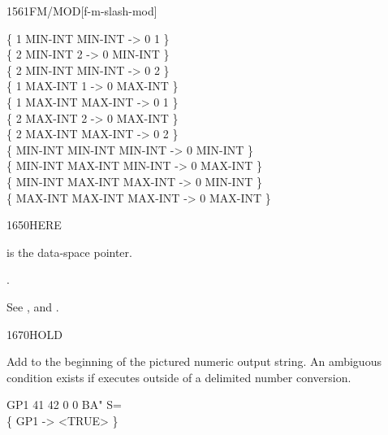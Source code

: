 \begin{worddef}{1561}{FM/MOD}[f-m-slash-mod]
\begin{defer}
		\{       1 MIN-INT  MIN-INT  ->  0       1 \} \\
		\{       2 MIN-INT        2  ->  0 MIN-INT \} \\
		\{       2 MIN-INT  MIN-INT  ->  0       2 \} \\
		\{       1 MAX-INT        1  ->  0 MAX-INT \} \\
		\{       1 MAX-INT  MAX-INT  ->  0       1 \} \\
		\{       2 MAX-INT        2  ->  0 MAX-INT \} \\
		\{       2 MAX-INT  MAX-INT  ->  0       2 \} \\
		\{ MIN-INT MIN-INT  MIN-INT  ->  0 MIN-INT \} \\
		\{ MIN-INT MAX-INT  MIN-INT  ->  0 MAX-INT \} \\
		\{ MIN-INT MAX-INT  MAX-INT  ->  0 MIN-INT \} \\
		\{ MAX-INT MAX-INT  MAX-INT  ->  0 MAX-INT \}
	\end{defer}
\end{worddef}


\begin{worddef}{1650}{HERE}
\item {}

	 is the data-space pointer.

\see {}.

	\begin{defer}
	\testing\rmfamily
		See ,
			 and
			.
	\end{defer}
\end{worddef}


\begin{worddef}{1670}{HOLD}
\item {}

	Add  to the beginning of the pictured numeric output
	string. An ambiguous condition exists if  executes
	outside of a   delimited number
	conversion.

	\begin{defer}
	\testing
		\word{:} GP1   41  42  0 0   BA" S= \word{;} \\
		\{ GP1 -> <TRUE> \}
	\end{defer}
\end{worddef}


